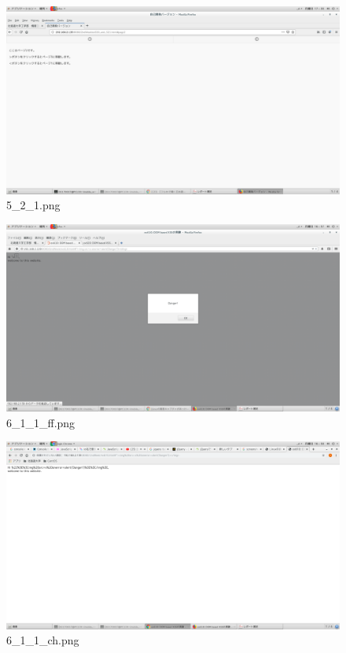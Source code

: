 \documentclass[a4j]{jarticle}
\begin{document}
  \vspace{1cm}
  \begin{figure}[htbp]
    \centering
    \includegraphics[width=13cm]{../webapp/png/5_2_1.png}
    \caption{5\_2\_1.png}
  \end{figure}

  \vspace{1cm}
  \begin{figure}[htbp]
    \centering
    \includegraphics[width=13cm]{../webapp/png/6_1_1_ff.png}
    \caption{6\_1\_1\_ff.png}
  \end{figure}

  \vspace{1cm}
  \begin{figure}[htbp]
    \centering
    \includegraphics[width=13cm]{../webapp/png/6_1_1_ch.png}
    \caption{6\_1\_1\_ch.png}
  \end{figure}
\end{document}
